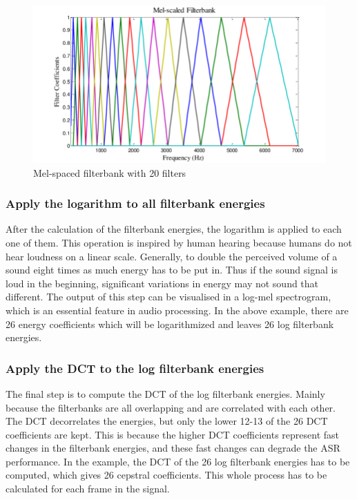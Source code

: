\begin{figure}[htbp]
	\centering
	\includegraphics[scale=0.4]{img/Mel-filter-banks-basis-functions-using-20-Mel-filters-in-the-filter-bank.png}
	\caption[Mel-spaced filterbank with 20 filters]{Mel-spaced filterbank with 20 filters\footnotemark}
	\label{fig:MFCC-Mel-Filterbank}
\end{figure}

\subsubsection{Apply the logarithm to all filterbank energies}
After the calculation of the filterbank energies, the logarithm is applied to each one of them. This operation is inspired by human hearing because humans do not hear loudness on a linear scale. Generally, to double the perceived volume of a sound eight times as much energy has to be put in. Thus if the sound signal is loud in the beginning, significant variations in energy may not sound that different. The output of this step can be visualised in a log-mel spectrogram, which is an essential feature in audio processing.
\newline
\newline
In the above example, there are 26 energy coefficients which will be logarithmized and leaves 26 log filterbank energies.

\subsubsection{Apply the \gls{DCT} to the log filterbank energies}
The final step is to compute the \gls{DCT} of the log filterbank energies. Mainly because the filterbanks are all overlapping and are correlated with each other. The \gls{DCT} decorrelates the energies, but only the lower 12-13 of the 26 \gls{DCT} coefficients are kept. This is because the higher \gls{DCT} coefficients represent fast changes in the filterbank energies, and these fast changes can degrade the \gls{ASR} performance.
\newline
\newline
In the example, the \gls{DCT} of the 26 log filterbank energies has to be computed, which gives 26 cepstral coefficients. This whole process has to be calculated for each frame in the signal.

